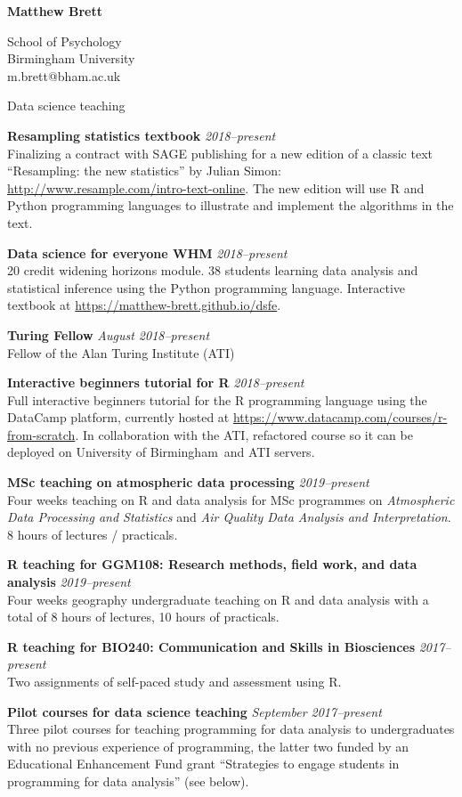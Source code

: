 \documentclass{cv}
\newcommand{\PlaceDateNote}[3]{{\bf #1} \hfill {\em #2} \\#3}
\newcommand{\UoB}{University of Birmingham}
\begin{document}
\nocite{*}

{\huge \bf Matthew Brett}

School of Psychology \\
Birmingham University \\
m.brett@bham.ac.uk

\begin{cvSection}{Data science teaching}

\PlaceDateNote{Resampling statistics textbook}{2018--present}
    {Finalizing a contract with SAGE publishing for a new edition of a classic
    text ``Resampling: the new statistics'' by Julian Simon:
    \url{http://www.resample.com/intro-text-online}. The new edition will use
    R and Python programming languages to illustrate and implement the
    algorithms in the text}.

\PlaceDateNote{Data science for everyone WHM}{2018--present}
    {20 credit widening horizons module. 38 students learning data
    analysis and statistical inference using the Python programming language.
    Interactive textbook at \url{https://matthew-brett.github.io/dsfe}.}

\PlaceDateNote{Turing Fellow}{August 2018--present}
    {Fellow of the Alan Turing Institute (ATI)}

\PlaceDateNote{Interactive beginners tutorial for R}{2018--present}
    {Full interactive beginners tutorial for the R programming language using
    the DataCamp platform, currently hosted at
    \url{https://www.datacamp.com/courses/r-from-scratch}. In collaboration
    with the ATI, refactored course so it can be deployed on \UoB\, and ATI
    servers.}

\PlaceDateNote{MSc teaching on atmospheric data processing}{2019--present}
    {Four weeks teaching on R and data analysis for MSc programmes on {\em
    Atmospheric Data Processing and Statistics} and {\em Air Quality Data
    Analysis and Interpretation}. 8 hours of lectures / practicals.}


\PlaceDateNote{R teaching for GGM108: Research methods, field work, and data
    analysis}{2019--present}
    {Four weeks geography undergraduate teaching on R and data analysis with a
    total of 8 hours of lectures, 10 hours of practicals}.

\PlaceDateNote{R teaching for BIO240: Communication and Skills in
    Biosciences}{2017--present}
    {Two assignments of self-paced study and assessment using R.}

\PlaceDateNote{Pilot courses for data science teaching}{September 2017--present}
    {Three pilot courses for teaching programming for data analysis to
    undergraduates with no previous experience of programming, the latter two
    funded by an Educational Enhancement Fund grant ``Strategies to engage
    students in programming for data analysis'' (see below).}


\end{cvSection}
\end{document}
